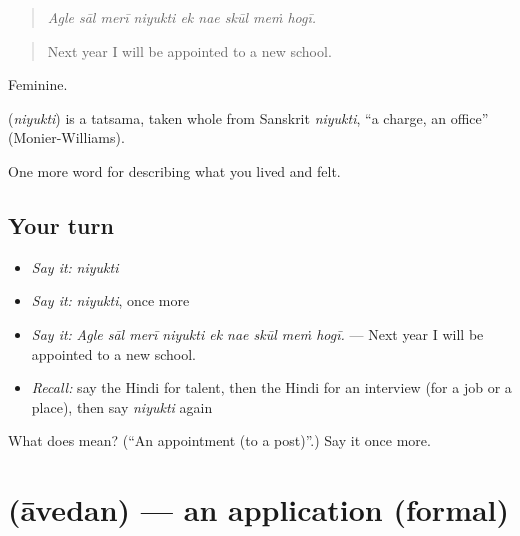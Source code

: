 \begin{quote}
        
\end{quote}

\begin{quote}
\emph{Agle sāl merī niyukti ek nae skūl meṁ hogī.}
\end{quote}

\begin{quote}
Next year I will be appointed to a new school.
\end{quote}

Feminine.

\begin{cousinweb}
\textbf{} (\emph{niyukti}) is a tatsama, taken whole from Sanskrit \emph{niyukti}, \textquotedblleft{}a charge, an office\textquotedblright{} (Monier-Williams).
\end{cousinweb}

\begin{grammarlens}[title={What you've built}]
One more word for describing what you lived and felt.
\end{grammarlens}

\subsection*{Your turn}
\begin{itemize}
\raggedright
  \item \emph{Say it:} \emph{niyukti}
  \item \emph{Say it:} \emph{niyukti}, once more
  \item \emph{Say it:} \emph{Agle sāl merī niyukti ek nae skūl meṁ hogī.} — Next year I will be appointed to a new school.
  \item \emph{Recall:} say the Hindi for talent, then the Hindi for an interview (for a job or a place), then say \emph{niyukti} again
\end{itemize}

\begin{tcolorbox}[breakable,colback=teal!4,colframe=teal!35!black,title={Before you move on}]
What does  mean? (\textquotedblleft{}An appointment (to a post)\textquotedblright{}.) Say it once more.
\end{tcolorbox}
\section[\texorpdfstring{\hi{आवेदन} (āvedan)}{आवेदन (āvedan)}]{ (āvedan) — an application (formal)}

